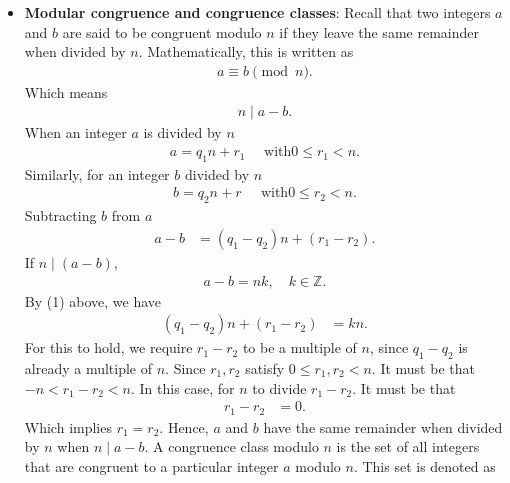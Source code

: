 \documentclass{report}
\begin{document}
    \pagebreak 
    \begin{itemize}
        \item \textbf{Modular congruence and congruence classes}: Recall that two integers $a$ and $b$ are said to be congruent modulo $n$ if they leave the same remainder when divided by $n$. Mathematically, this is written as
            \begin{align*}
                a\equiv b \pmod{n}
            .\end{align*}
            Which means
            \begin{align*}
                n \mid a-b
            .\end{align*}
            When an integer $a$ is divided by $n$
            \begin{align*}
                a = q_{1}n + r_{1} \quad \text{ with} 0 \leq r_{1} < n
            .\end{align*}
            Similarly, for an integer $b$ divided by $n$
            \begin{align*}
                b = q_{2}n + r_{} \quad \text{ with} 0 \leq r_{2} < n
            .\end{align*}
            Subtracting $b$ from $a$
            \begin{align*}
                a - b &= (q_{1} - q_{2})n + (r_{1} - r_{2}) \tag{1}
            .\end{align*}
            If $n\mid (a-b)$, 
            \begin{align*}
                a-b=nk, \quad k\in \mathbb{Z}
            .\end{align*}
            By (1) above, we have
            \begin{align*}
                (q_{1} - q_{2})n + (r_{1} - r_{2}) &= kn
            .\end{align*}
            For this to hold, we require $r_{1}-r_{2}$ to be a multiple of $n$, since $q_{1} - q_{2}$ is already a multiple of $n$. Since $r_{1}, r_{2}$ satisfy $0 \leq r_{1}, r_{2} < n$. It must be that $-n < r_{1}- r_{2} < n$. In this case, for $n$ to divide $r_{1} - r_{2}$. It must be that
            \begin{align*}
                r_{1} - r_{2} &= 0 
            .\end{align*}
            Which implies $r_{1} = r_{2}$. Hence, $a$ and $b$ have the same remainder when divided by $n$ when $n\mid a-b$.
            \bigbreak \noindent 
            A congruence class modulo $n$ is the set of all integers that are congruent to a particular integer $a$ modulo $n$. This set is denoted as

\end{itemize}
\end{document}
